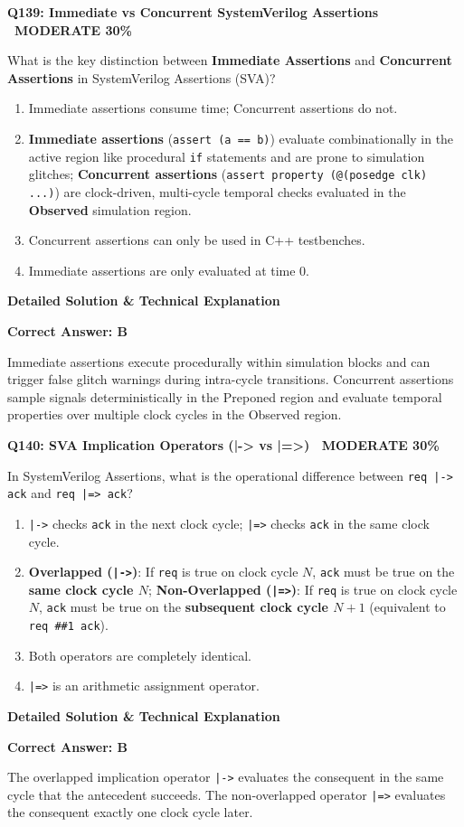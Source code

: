 \documentclass[11pt,a4paper]{article}
\newcommand{\badgemod}{{\color{white}\colorbox{modoran}{\bfseries\sffamily\tiny\ MODERATE 30\%\ }}}
\newenvironment{qbox}[2]{%
  \begin{mdframed}[style=qstyle]%
  {\bfseries\sffamily\color{primaryblue}#1 \hfill #2}\par\vspace{2pt}%
}{%
  \end{mdframed}%
}
\newenvironment{ansbox}{%
  \begin{mdframed}[style=ansstyle]%
  {\bfseries\sffamily\color{ansgreen}\small Detailed Solution \& Technical Explanation}\par\vspace{2pt}\small%
}{%
  \end{mdframed}%
}
\begin{document}
\begin{qbox}{Q139: Immediate vs Concurrent SystemVerilog Assertions}{\badgemod}
What is the key distinction between \textbf{Immediate Assertions} and \textbf{Concurrent Assertions} in SystemVerilog Assertions (SVA)?
\begin{enumerate}[label=\textbf{\Alph*.}]
  \item Immediate assertions consume time; Concurrent assertions do not.
  \item \textbf{Immediate assertions} (\texttt{assert (a == b)}) evaluate combinationally in the active region like procedural \texttt{if} statements and are prone to simulation glitches; \textbf{Concurrent assertions} (\texttt{assert property (@(posedge clk) ...)}) are clock-driven, multi-cycle temporal checks evaluated in the \textbf{Observed} simulation region.
  \item Concurrent assertions can only be used in C++ testbenches.
  \item Immediate assertions are only evaluated at time 0.
\end{enumerate}
\end{qbox}
\begin{ansbox}
\textbf{Correct Answer: B}

Immediate assertions execute procedurally within simulation blocks and can trigger false glitch warnings during intra-cycle transitions. Concurrent assertions sample signals deterministically in the Preponed region and evaluate temporal properties over multiple clock cycles in the Observed region.
\end{ansbox}

\begin{qbox}{Q140: SVA Implication Operators (|-> vs |=>)}{\badgemod}
In SystemVerilog Assertions, what is the operational difference between \texttt{req |-> ack} and \texttt{req |=> ack}?
\begin{enumerate}[label=\textbf{\Alph*.}]
  \item \texttt{|->} checks \texttt{ack} in the next clock cycle; \texttt{|=>} checks \texttt{ack} in the same clock cycle.
  \item \textbf{Overlapped (\texttt{|->})}: If \texttt{req} is true on clock cycle $N$, \texttt{ack} must be true on the \textbf{same clock cycle $N$}; \textbf{Non-Overlapped (\texttt{|=>})}: If \texttt{req} is true on clock cycle $N$, \texttt{ack} must be true on the \textbf{subsequent clock cycle $N+1$} (equivalent to \texttt{req \#\#1 ack}).
  \item Both operators are completely identical.
  \item \texttt{|=>} is an arithmetic assignment operator.
\end{enumerate}
\end{qbox}
\begin{ansbox}
\textbf{Correct Answer: B}

The overlapped implication operator \texttt{|->} evaluates the consequent in the same cycle that the antecedent succeeds. The non-overlapped operator \texttt{|=>} evaluates the consequent exactly one clock cycle later.
\end{ansbox}
\end{document}
